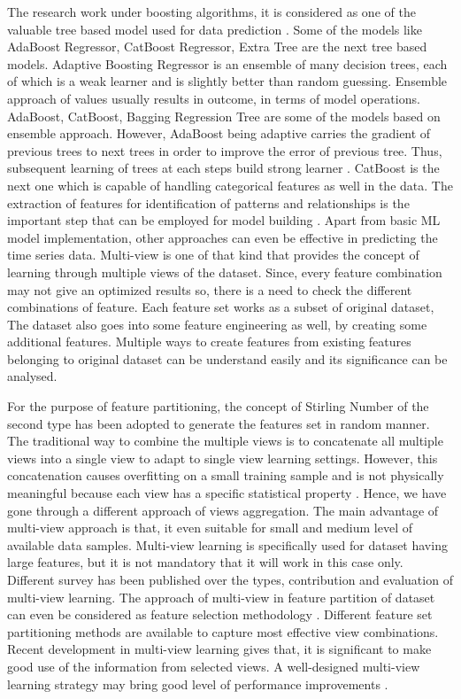 The research work under boosting algorithms, it is considered as one of the valuable tree based model  used for data prediction \cite{mayr2014evolution}. Some of the models like AdaBoost Regressor, CatBoost Regressor, Extra Tree are the next tree based models. Adaptive Boosting Regressor is an ensemble of many decision trees, each of which is a weak learner and is slightly better than random guessing. Ensemble approach of values usually results in outcome, in terms of model operations. AdaBoost, CatBoost, Bagging Regression Tree \cite{xu2021influential} are some of the models based on ensemble approach. However, AdaBoost being adaptive carries the gradient of previous trees to next trees in order to improve the error of previous tree. Thus, subsequent learning of trees at each steps build strong learner \cite{patil2018life}. CatBoost is the next one which is capable of handling categorical features as well in the data. The extraction of features for identification of patterns and relationships is the important step that can be employed for model building \cite{janiesch2021machine}. Apart from basic ML model implementation, other approaches can even be effective in predicting the time series data. Multi-view is one of that kind that provides the concept of learning through multiple views of the dataset.  Since, every feature combination may not give an optimized results so, there is a need to check the different combinations of feature. Each feature set works as a subset of original dataset, The dataset also goes into some feature engineering \cite{long2019deep} as well, by creating some additional features. Multiple ways to create features from existing features belonging to original dataset can be understand easily and its significance can be analysed.

For the purpose of feature partitioning, the concept of Stirling Number \cite{kereskenyi2014stirling} of the second type has been adopted to generate the features set in random manner. The traditional way to combine the multiple views is to concatenate all multiple views into a single view to adapt to single view learning settings. However, this concatenation causes overfitting on a small training sample and is not physically meaningful because each view has a specific statistical property \cite{xu2013survey}. Hence, we have gone through a different approach of views aggregation. The main advantage of multi-view approach is that, it even suitable for small and medium level of available data samples. Multi-view learning is specifically used for dataset having large features, but it is not mandatory that it will work in this case only. Different survey has been published over the types, contribution and evaluation of multi-view learning. The approach of multi-view in feature partition of dataset can even be considered as feature selection methodology \cite{cherrington2019feature}. Different feature set partitioning methods are available to capture most effective view combinations. Recent development in multi-view learning gives that, it is significant to make good use of the information from selected views. A well-designed multi-view learning strategy may bring good level of performance improvements \cite{zhao2017multi}. 


